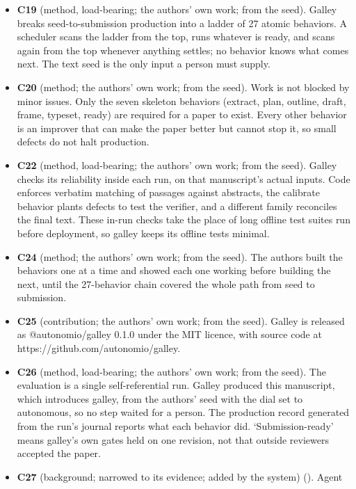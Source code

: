 \documentclass[
]{article}
\begin{document}
\begin{itemize}
  built for semi-autonomous software engineering.
\item
  \textbf{C19} (method, load-bearing; the authors' own work; from the
  seed). Galley breaks seed-to-submission production into a ladder of 27
  atomic behaviors. A scheduler scans the ladder from the top, runs
  whatever is ready, and scans again from the top whenever anything
  settles; no behavior knows what comes next. The text seed is the only
  input a person must supply.
\item
  \textbf{C20} (method; the authors' own work; from the seed). Work is
  not blocked by minor issues. Only the seven skeleton behaviors
  (extract, plan, outline, draft, frame, typeset, ready) are required
  for a paper to exist. Every other behavior is an improver that can
  make the paper better but cannot stop it, so small defects do not halt
  production.
\item
  \textbf{C22} (method, load-bearing; the authors' own work; from the
  seed). Galley checks its reliability inside each run, on that
  manuscript's actual inputs. Code enforces verbatim matching of
  passages against abstracts, the calibrate behavior plants defects to
  test the verifier, and a different family reconciles the final text.
  These in-run checks take the place of long offline test suites run
  before deployment, so galley keeps its offline tests minimal.
\item
  \textbf{C24} (method; the authors' own work; from the seed). The
  authors built the behaviors one at a time and showed each one working
  before building the next, until the 27-behavior chain covered the
  whole path from seed to submission.
\item
  \textbf{C25} (contribution; the authors' own work; from the seed).
  Galley is released as @autonomio/galley 0.1.0 under the MIT licence,
  with source code at https://github.com/autonomio/galley.
\item
  \textbf{C26} (method, load-bearing; the authors' own work; from the
  seed). The evaluation is a single self-referential run. Galley
  produced this manuscript, which introduces galley, from the authors'
  seed with the dial set to autonomous, so no step waited for a person.
  The production record generated from the run's journal reports what
  each behavior did. `Submission-ready' means galley's own gates held on
  one revision, not that outside reviewers accepted the paper.
\item
  \textbf{C27} (background; narrowed to its evidence; added by the
  system) (). Agent

\end{itemize}
\end{document}
